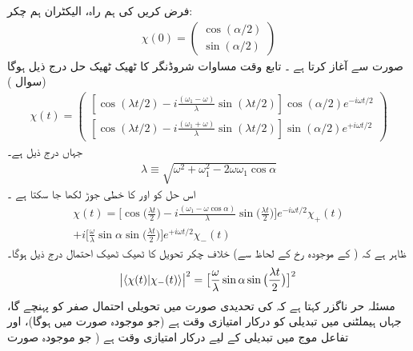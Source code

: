 فرض کریں  کی  ہم راہ،    الیکٹران ہم چکر:
\begin{align}
\chi (0) = 
\begin{pmatrix} 
\cos(\alpha/2) \\
\sin(\alpha/2)
\end{pmatrix}
\end{align}
  صورت سے آغاز کرتا ہے ۔  تابع وقت مساوات شروڈنگر کا  ٹھیک ٹھیک  حل درج ذیل ہوگا  (سوال  )
\begin{align}\label{مساوات_حر_حل_مخصوص_ہیملٹنی}
\chi (t) = 
\begin{pmatrix}
[\cos(\lambda t/2) - i \frac{(\omega_1 - \omega)}{\lambda} \sin(\lambda t/2)] \cos(\alpha/2) e^{- i \omega t/2} \\
[\cos(\lambda t/2) - i \frac{(\omega_1 + \omega)}{\lambda} \sin(\lambda t/2)] \sin(\alpha/2) e^{+ i \omega t/2}
\end{pmatrix}
\end{align}
جہاں  درج ذیل  ہے۔
\begin{align}
\lambda \equiv \sqrt{\omega^2 + \omega_1^2 - 2 \omega \omega_1 \cos \alpha}
\end{align}
اس حل  کو   اور  کا خطی  جوڑ  لکھا جا سکتا ہے ۔
\begin{multline}\label{مساوات_حر_حل_خطی_جوڑ}
\chi (t) = \big [ \cos\big ( \frac{\lambda t}{2} \big ) - i \frac{(\omega_1 - \omega \cos \alpha)}{\lambda} \sin\big ( \frac{\lambda t}{2} \big ) \big ] e^{- i \omega t/2} \chi_{+} (t) \\
+ i \big [ \frac{\omega}{\lambda} \sin \alpha \sin \big ( \frac{\lambda t}{2} \big ) \big ] e^{+ i \omega t/2} \chi_- (t)
\end{multline}
ظاہر ہے کہ  ( کے موجودہ رخ کے لحاظ سے)  خلاف چکر  تحویل کا ٹھیک ٹھیک احتمال درج ذیل ہوگا۔ 
\begin{align}\label{مساوات_حر_تحویلی_احتمال}
\abs{\langle \chi (t) | \chi_{-} (t) \rangle}^2 = \big [ \frac{\omega}{\lambda} \sin \alpha \sin \big ( \frac{\lambda t}{2} \big ) \big ]^2
\end{align}
مسئلہ حر ناگزر کہتا ہے کہ  کی تحدیدی صورت میں تحویلی احتمال صفر کو پہنچے گا،  جہاں ہیملٹنی میں تبدیلی کو درکار امتیازی وقت  ہے  (جو موجودہ صورت میں  ہوگا)،  اور تفاعل موج میں تبدیلی کے لیے درکار امتیازی وقت  ہے ( جو موجودہ صورت 

